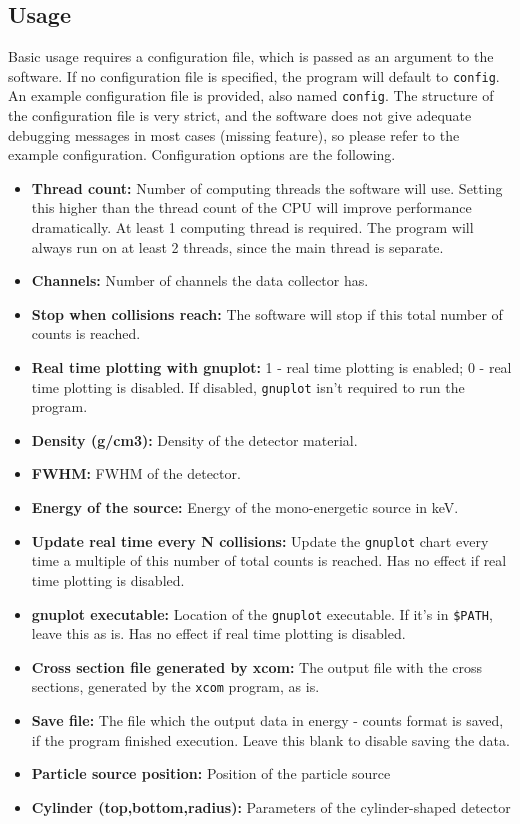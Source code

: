 \documentclass[a4paper,12pt]{article}
\begin{document}
\subsection{Usage}
Basic usage requires a configuration file, which is passed as an argument to the software. If no configuration file is specified, the program will default to \texttt{config}. An example configuration file is provided, also named \texttt{config}. The structure of the configuration file is very strict, and the software does not give adequate debugging messages in most cases (missing feature), so please refer to the example configuration. Configuration options are the following.
\begin{itemize}
\item \textbf{Thread count:} Number of computing threads the software will use. Setting this higher than the thread count of the CPU will improve performance dramatically. At least 1 computing thread is required. The program will always run on at least 2 threads, since the main thread is separate.
\item \textbf{Channels:} Number of channels the data collector has.
\item \textbf{Stop when collisions reach:} The software will stop if this total number of counts is reached.
\item \textbf{Real time plotting with gnuplot:} 1 - real time plotting is enabled; 0 - real time plotting is disabled. If disabled, \texttt{gnuplot} isn't required to run the program. \label{nognuplot}
\item \textbf{Density (g/cm3):} Density of the detector material.
\item \textbf{FWHM:} FWHM of the detector.
\item \textbf{Energy of the source:} Energy of the mono-energetic source in keV.
\item \textbf{Update real time every N collisions:} Update the \texttt{gnuplot} chart every time a multiple of this number of total counts is reached. Has no effect if real time plotting is disabled.
\item \textbf{gnuplot executable:} Location of the \texttt{gnuplot} executable. If it's in \texttt{\$PATH}, leave this as is. Has no effect if real time plotting is disabled.
\item \textbf{Cross section file generated by xcom:} The output file with the cross sections, generated by the \texttt{xcom} program, as is.
\item \textbf{Save file:} The file which the output data in energy - counts format is saved, if the program finished execution. Leave this blank to disable saving the data.
\item \textbf{Particle source position:} Position of the particle source
\item \textbf{Cylinder (top,bottom,radius):} Parameters of the cylinder-shaped detector
\end{itemize}
\end{document}
